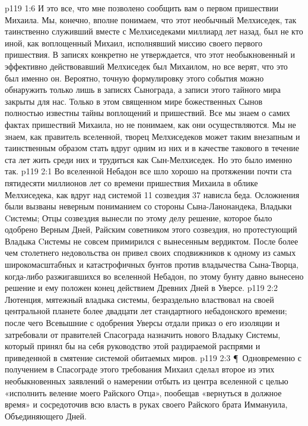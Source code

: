 \vs p119 1:6 И это все, что мне позволено сообщить вам о первом пришествии Михаила. Мы, конечно, вполне понимаем, что этот необычный Мелхиседек, так таинственно служивший вместе с Мелхиседеками миллиард лет назад, был не кто иной, как воплощенный Михаил, исполнявший миссию своего первого пришествия. В записях конкретно не утверждается, что этот необыкновенный и эффективно действовавший Мелхиседек был Михаилом, но все верят, что это был именно он. Вероятно, точную формулировку этого события можно обнаружить только лишь в записях Сынограда, а записи этого тайного мира закрыты для нас. Только в этом священном мире божественных Сынов полностью известны тайны воплощений и пришествий. Все мы знаем о самих фактах пришествий Михаила, но не понимаем, как они осуществляются. Мы не знаем, как правитель вселенной, творец Мелхиседеков может таким внезапным и таинственным образом стать вдруг одним из них и в качестве такового в течение ста лет жить среди них и трудиться как Сын\hyp{}Мелхиседек. Но это было именно так.
\vs p119 2:1 Во вселенной Небадон все шло хорошо на протяжении почти ста пятидесяти миллионов лет со времени пришествия Михаила в облике Мелхиседека, как вдруг над системой 11 созвездия 37 нависла беда. Осложнения были вызваны неверным пониманием со стороны Сына\hyp{}Ланонандека, Владыки Cистемы; Отцы созвездия вынесли по этому делу решение, которое было одобрено Верным Дней, Райским советником этого созвездия, но протестующий Владыка Cистемы не совсем примирился с вынесенным вердиктом. После более чем столетнего недовольства он привел своих сподвижников к одному из самых широкомасштабных и катастрофичных бунтов против владычества Сына\hyp{}Творца, когда\hyp{}либо разжигавшихся во вселенной Небадон, по этому бунту давно вынесено решение и ему положен конец действием Древних Дней в Уверсе.
\vs p119 2:2 Лютенция, мятежный владыка системы, безраздельно властвовал на своей центральной планете более двадцати лет стандартного небадонского времени; после чего Всевышние с одобрения Уверсы отдали приказ о его изоляции и затребовали от правителей Спасограда назначить нового Владыку Системы, который принял бы на себя руководство этой раздираемой распрями и приведенной в смятение системой обитаемых миров.
\vs p119 2:3 \P\ Одновременно с получением в Спасограде этого требования Михаил сделал второе из этих необыкновенных заявлений о намерении отбыть из центра вселенной с целью «исполнить веление моего Райского Отца», пообещав «вернуться в должное время» и сосредоточив всю власть в руках своего Райского брата Иммануила, Объединяющего Дней.

